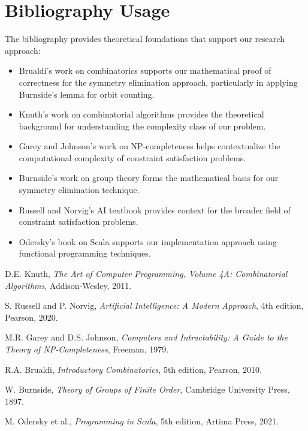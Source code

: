 \documentclass[12pt,a4paper]{article}
\theoremstyle{definition}
\begin{document}
\section{Bibliography Usage}

The bibliography provides theoretical foundations that support our research approach:
\begin{itemize}
    \item Brualdi's work on combinatorics \cite{brualdi2010} supports our mathematical proof of correctness for the symmetry elimination approach, particularly in applying Burnside's lemma for orbit counting.
    \item Knuth's work on combinatorial algorithms \cite{knuth1975} provides the theoretical background for understanding the complexity class of our problem.
    \item Garey and Johnson's work on NP-completeness \cite{garey1979} helps contextualize the computational complexity of constraint satisfaction problems.
    \item Burnside's work on group theory \cite{burnside1897} forms the mathematical basis for our symmetry elimination technique.
    \item Russell and Norvig's AI textbook \cite{russell2020} provides context for the broader field of constraint satisfaction problems.
    \item Odersky's book on Scala \cite{scala2021} supports our implementation approach using functional programming techniques.
\end{itemize}


\begin{thebibliography}{99}

D.E. Knuth, \emph{The Art of Computer Programming, Volume 4A: Combinatorial Algorithms}, Addison-Wesley, 2011.

S. Russell and P. Norvig, \emph{Artificial Intelligence: A Modern Approach}, 4th edition, Pearson, 2020.

M.R. Garey and D.S. Johnson, \emph{Computers and Intractability: A Guide to the Theory of NP-Completeness}, Freeman, 1979.

R.A. Brualdi, \emph{Introductory Combinatorics}, 5th edition, Pearson, 2010.

W. Burnside, \emph{Theory of Groups of Finite Order}, Cambridge University Press, 1897.

M. Odersky et al., \emph{Programming in Scala}, 5th edition, Artima Press, 2021.

\end{thebibliography}
\end{document}
